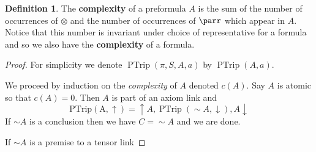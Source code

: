 \documentclass[12pt]{article}
\theoremstyle{plain}
\theoremstyle{definition}
\newtheorem{defn}[thm]{Definition} %
\newcommand{\negation}{\sim}
\begin{document}
\begin{defn}
The \textbf{complexity} of a preformula $A$ is the sum of the number of occurrences of $\otimes$ and the number of occurrences of $\parr$ which appear in $A$. Notice that this number is invariant under choice of representative for a formula and so we also have the \textbf{complexity} of a formula.
\end{defn}
\begin{proof}
For simplicity we denote $\operatorname{PTrip}(\pi, S, A, a)$ by $\operatorname{PTrip}(A, a)$.

We proceed by induction on the \emph{complexity} of $A$ denoted $c(A)$. Say $A$ is atomic so that $c(A) = 0$. Then $A$ is part of an axiom link and
\begin{equation}
    \operatorname{PTrip(A,\uparrow)} = \uparrow A, \operatorname{PTrip}(\negation A, \downarrow), A\downarrow
\end{equation}
If $\negation A$ is a conclusion then we have $C = \negation A$ and we are done.

If $\negation A$ is a premise to a tensor link
\end{proof}
\end{document}
